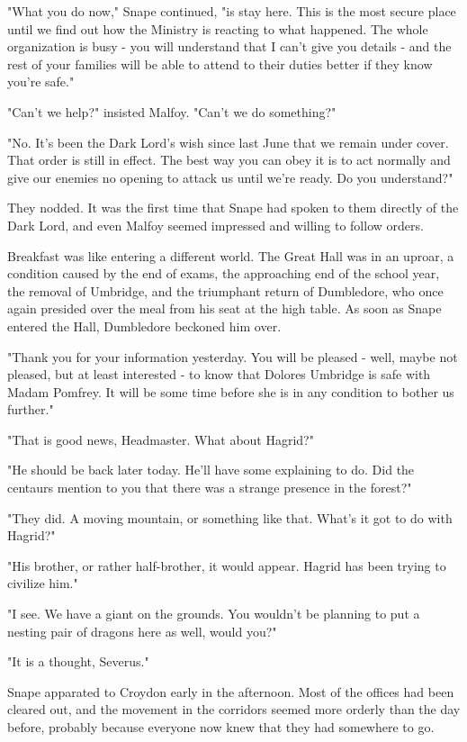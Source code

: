 "What you do now," Snape continued, "is stay here. This is the most secure place until we find out how the Ministry is reacting to what happened. The whole organization is{\el} busy - you will understand that I can't give you details - and the rest of your families will be able to attend to their duties better if they know you're safe."

"Can't we help?" insisted Malfoy. "Can't we do something?"

"No. It's been the Dark Lord's wish since last June that we remain under cover. That order is still in effect. The best way you can obey it is to act normally and give our enemies no opening to attack us until we're ready. Do you understand?"

They nodded. It was the first time that Snape had spoken to them directly of the Dark Lord, and even Malfoy seemed impressed and willing to follow orders.

Breakfast was like entering a different world. The Great Hall was in an uproar, a condition caused by the end of exams, the approaching end of the school year, the removal of Umbridge, and the triumphant return of Dumbledore, who once again presided over the meal from his seat at the high table. As soon as Snape entered the Hall, Dumbledore beckoned him over.

"Thank you for your information yesterday. You will be pleased - well, maybe not pleased, but at least interested - to know that Dolores Umbridge is safe with Madam Pomfrey. It will be some time before she is in any condition to bother us further."

"That is good news, Headmaster. What about Hagrid?"

"He should be back later today. He'll have some explaining to do. Did the centaurs mention to you that there was a strange presence in the forest?"

"They did. A moving mountain, or something like that. What's it got to do with Hagrid?"

"His brother, or rather half-brother, it would appear. Hagrid has been trying to civilize him."

"I see. We have a giant on the grounds. You wouldn't be planning to put a nesting pair of dragons here as well, would you?"

"It is a thought, Severus."

Snape apparated to Croydon early in the afternoon. Most of the offices had been cleared out, and the movement in the corridors seemed more orderly than the day before, probably because everyone now knew that they had somewhere to go.

